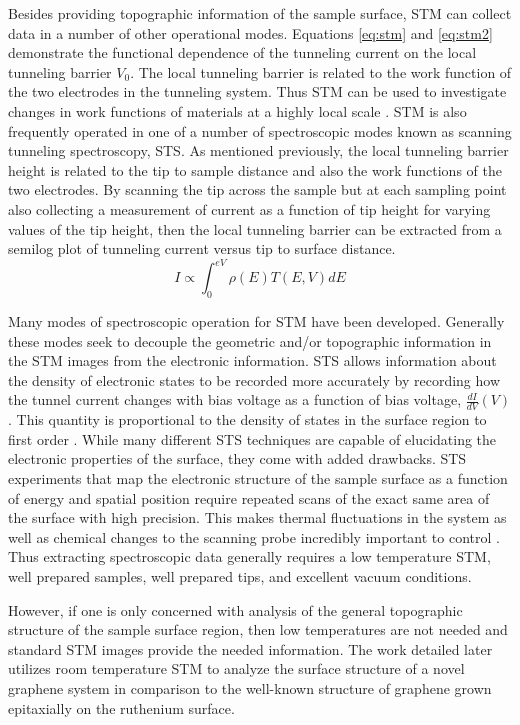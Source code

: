 Besides providing topographic information of the sample surface, STM can collect data in a number of other operational modes. Equations \ref{eq:stm} and \ref{eq:stm2} demonstrate the functional dependence of the tunneling current on the local tunneling barrier $V_0$. The local tunneling barrier is related to the work function of the two electrodes in the tunneling system. Thus STM can be used to investigate changes in work functions of materials at a highly local scale \cite{STM-I}. STM is also frequently operated in one of a number of spectroscopic modes known as scanning tunneling spectroscopy, STS. As mentioned previously, the local tunneling barrier height is related to the tip to sample distance and also the work functions of the two electrodes. By scanning the tip across the sample but at each sampling point also collecting a measurement of current as a function of tip height for varying values of the tip height, then the local tunneling barrier can be extracted from a semilog plot of tunneling current versus tip to surface distance.
\begin{equation}
\label{eq:stm3}
I \propto \int_{0}^{eV} \rho(E) T(E,V) dE
\end{equation}

Many modes of spectroscopic operation for STM have been developed. Generally these modes seek to decouple the geometric and/or topographic information in the STM images from the electronic information. STS allows information about the density of electronic states to be recorded more accurately by recording how the tunnel current changes with bias voltage as a function of bias voltage, $\frac{dI}{dV}(V)$. This quantity is proportional to the density of states in the surface region to first order \cite{SPM-methods}. While many different STS techniques are capable of elucidating the electronic properties of the surface, they come with added drawbacks. STS experiments that map the electronic structure of the sample surface as a function of energy and spatial position require repeated scans of the exact same area of the surface with high precision. This makes thermal fluctuations in the system as well as chemical changes to the scanning probe incredibly important to control \cite{SPM-methods}. Thus extracting spectroscopic data generally requires a low temperature STM, well prepared samples, well prepared tips, and excellent vacuum conditions.


However, if one is only concerned with analysis of the general topographic structure of the sample surface region, then low temperatures are not needed and standard STM images provide the needed information. The work detailed later utilizes room temperature STM to analyze the surface structure of a novel graphene system in comparison to the well-known structure of graphene grown epitaxially on the ruthenium surface.

